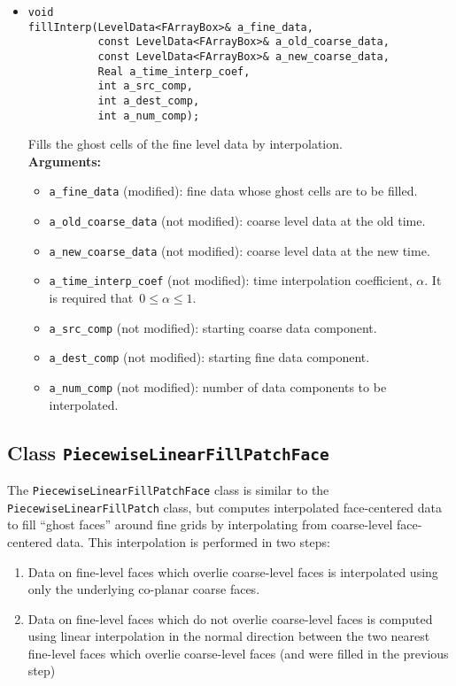 \begin{itemize}
\item
\begin{verbatim}
void
fillInterp(LevelData<FArrayBox>& a_fine_data,
           const LevelData<FArrayBox>& a_old_coarse_data,
           const LevelData<FArrayBox>& a_new_coarse_data,
           Real a_time_interp_coef,
           int a_src_comp,
           int a_dest_comp,
           int a_num_comp);
\end{verbatim}
Fills the ghost cells of the fine level data by interpolation. 
\\ {\bf Arguments:}
  \begin{itemize}
  \item
  \verb|a_fine_data| (modified): fine data whose ghost
  cells are to be filled.
  \item
  \verb|a_old_coarse_data| (not modified): coarse level data at
  the old time.
  \item
  \verb|a_new_coarse_data| (not modified): coarse level data at
  the new time.
  \item
  \verb|a_time_interp_coef| (not modified): time interpolation
  coefficient, $\alpha$.  It is required
  that~$0 \le \alpha \le 1$.
  \item
  \verb|a_src_comp| (not modified): starting coarse data component.
  \item
  \verb|a_dest_comp| (not modified): starting fine data component.
  \item
  \verb|a_num_comp| (not modified): number of data components to be
  interpolated.
  \end{itemize}

\end{itemize}

\subsection{Class {\tt PiecewiseLinearFillPatchFace}}
The {\tt PiecewiseLinearFillPatchFace} class is similar to the {\tt
  PiecewiseLinearFillPatch} class, but computes interpolated 
  face-centered data to fill ``ghost faces'' around fine grids by
  interpolating from coarse-level face-centered data. This
  interpolation is performed in two steps:
\begin{enumerate}
\item Data on fine-level faces which overlie coarse-level faces is
  interpolated using only the underlying co-planar coarse faces.
\item Data on fine-level faces which do not overlie coarse-level faces
  is computed using linear interpolation in the normal direction
  between the two nearest fine-level faces which overlie coarse-level
  faces (and were filled in the previous step)
\end{enumerate}

